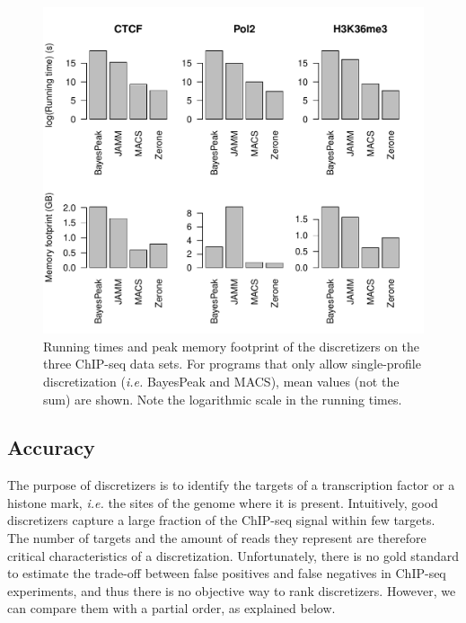 \documentclass{bioinfo}
\begin{document}
\begin{figure}[!tpb]
\centerline{\includegraphics[scale=0.5]{performance.pdf}}
\caption{
  Running times and peak memory footprint of the
  discretizers on the three ChIP-seq data sets. For programs that only
  allow single-profile discretization (\textit{i.e.} BayesPeak and MACS),
  mean values (not the sum) are shown. Note the logarithmic scale in the
  running times.
}\label{fig:perf}
\end{figure}

\subsection{Accuracy}
The purpose of discretizers is to identify the targets of a
transcription factor or a histone mark, \textit{i.e.} the sites of
the genome where it is present.
Intuitively, good discretizers capture a large fraction of the
ChIP-seq signal within few targets. The number of targets
and the amount of reads they represent are therefore critical
characteristics of a discretization. Unfortunately, there is no gold
standard to estimate the trade-off between false positives and false
negatives in ChIP-seq experiments, and thus there is no objective way
to rank discretizers. However, we can compare them with a partial order,
as explained below.
\end{document}
